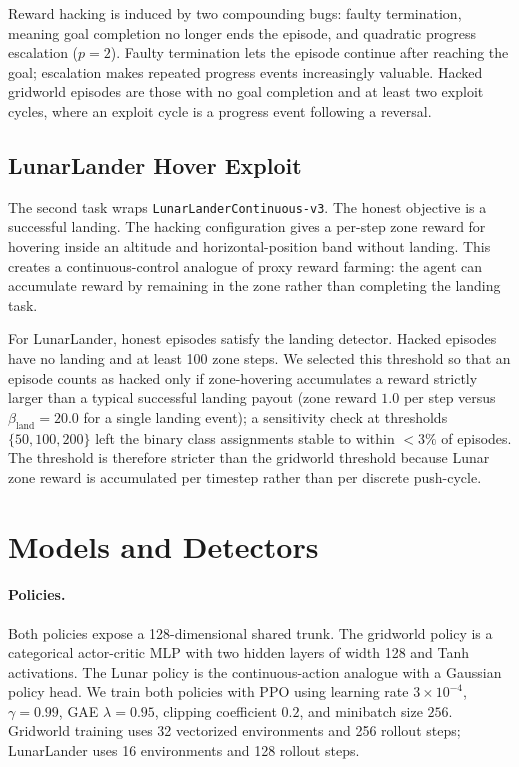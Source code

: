 \documentclass[11pt]{article}
\newcommand{\code}[1]{\texttt{#1}}
\begin{document}
Reward hacking is induced by two compounding bugs: faulty termination, meaning goal completion no longer ends the episode, and quadratic progress escalation ($p=2$). Faulty termination lets the episode continue after reaching the goal; escalation makes repeated progress events increasingly valuable. Hacked gridworld episodes are those with no goal completion and at least two exploit cycles, where an exploit cycle is a progress event following a reversal.

\subsection{LunarLander Hover Exploit}

The second task wraps \code{LunarLanderContinuous-v3}. The honest objective is a successful landing. The hacking configuration gives a per-step zone reward for hovering inside an altitude and horizontal-position band without landing. This creates a continuous-control analogue of proxy reward farming: the agent can accumulate reward by remaining in the zone rather than completing the landing task.

For LunarLander, honest episodes satisfy the landing detector. Hacked episodes have no landing and at least 100 zone steps. We selected this threshold so that an episode counts as hacked only if zone-hovering accumulates a reward strictly larger than a typical successful landing payout (zone reward $1.0$ per step versus $\beta_{\text{land}}=20.0$ for a single landing event); a sensitivity check at thresholds $\{50, 100, 200\}$ left the binary class assignments stable to within $<3\%$ of episodes. The threshold is therefore stricter than the gridworld threshold because Lunar zone reward is accumulated per timestep rather than per discrete push-cycle.

\section{Models and Detectors}

\paragraph{Policies.}
Both policies expose a 128-dimensional shared trunk. The gridworld policy is a categorical actor-critic MLP with two hidden layers of width 128 and Tanh activations. The Lunar policy is the continuous-action analogue with a Gaussian policy head. We train both policies with PPO \cite{schulman2017ppo} using learning rate $3\times 10^{-4}$, $\gamma=0.99$, GAE $\lambda=0.95$, clipping coefficient $0.2$, and minibatch size $256$. Gridworld training uses 32 vectorized environments and 256 rollout steps; LunarLander uses 16 environments and 128 rollout steps.
\end{document}
